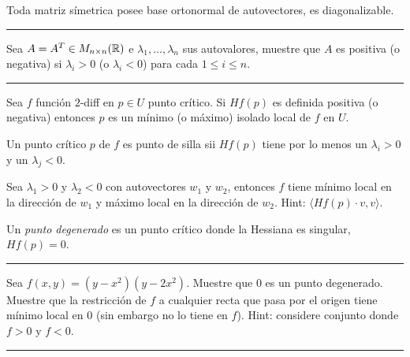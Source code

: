 \E

\begin{theorem}
    Toda matriz símetrica posee base ortonormal de autovectores, es diagonalizable. 
\end{theorem}

\E

\hrule
\begin{exercise}
    Sea \(A=A^T\in M_{n\times n}(\mathbb{R})\) e \(\lambda_1, \ldots, \lambda_n\) sus autovalores, muestre que \(A\) es positiva (o negativa) si \(\lambda_i>0 \) (o \(\lambda_i <0\)) para cada \(1\leq i\leq n\). 
\end{exercise}
\hrule 

\E

\begin{theorem}
    Sea \(f\) función \(2\)-diff en \(p\in U\) punto crítico. Si \(Hf(p)\) es definida positiva (o negativa) entonces \(p\) es un mínimo (o máximo) isolado local de \(f\) en \(U\). 
\end{theorem}
\begin{definition}
    Un punto crítico \(p\) de \(f\) es punto de silla sii \(Hf(p)\) tiene por lo menos un \(\lambda_i >0\) y un \(\lambda_j<0\). 
\end{definition}
\begin{note}
    Sea \(\lambda_1 > 0 \) y \(\lambda_2<0\) con autovectores \(w_1\) y \( w_2\), entonces \(f\) tiene mínimo local en la dirección de \(w_1\) y máximo local en la dirección de \(w_2\). Hint: \(\langle Hf(p)\cdot v, v\rangle \). 
\end{note}
\begin{definition}
   Un \emph{punto degenerado} es un punto crítico donde la Hessiana es singular, \(Hf(p)= 0\).  
\end{definition}

\E

\hrule
\begin{exercise}
    Sea \(f(x,y)= (y-x^2)(y-2x^2)\). Muestre que \(0\) es un punto degenerado. Muestre que la restricción de \(f\) a cualquier recta que pasa por el origen tiene mínimo local en \(0\) (sin embargo no lo tiene en \(f\)). Hint: considere conjunto donde \(f>0\) y \(f<0\). 
\end{exercise}
\hrule 